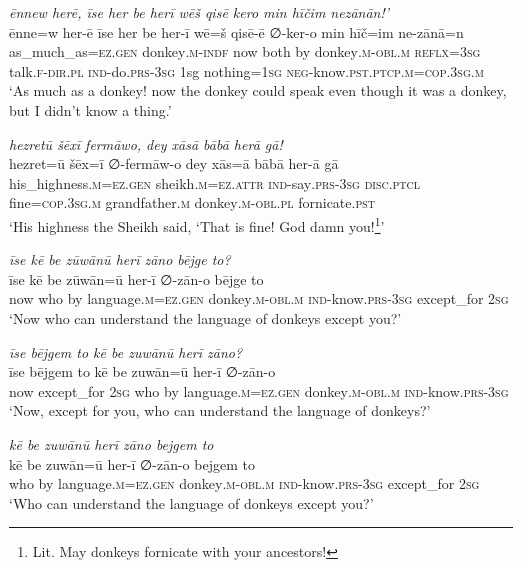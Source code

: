 \ea \label{HB.84}
\textit{ēnnew herē, īse her be herī wēš qisē kero min hīčim nezānān!’} \\ 
\gll ēnne=w her-ē īse her be her-ī wē=š qisē-ē ∅-ker-o min hīč=im ne-zānā=n \\ 
 as\_much\_as\textsc{=ez}\textsc{.gen} donkey\textsc{.m}\textsc{-indf} now both by donkey\textsc{.m}\textsc{-obl}\textsc{.m} \textsc{reflx}\textsc{=3sg} talk\textsc{\textsc{.f}}\textsc{-dir}\textsc{.pl} \textsc{ind-}do\textsc{.prs}\textsc{-3sg} 1sg nothing\textsc{=1sg} \textsc{neg-}know\textsc{.pst}\textsc{.ptcp}\textsc{.m}\textsc{=cop}\textsc{.3sg}\textsc{.m} \\ 
\glt `As much as a donkey! now the donkey could speak even though it was a donkey, but I didn’t know a thing.'
\z 
 
\ea \label{HB.85}
\textit{hezretū šēxī fermāwo, dey xāsā bābā herā gā!} \\ 
\gll hezret=ū šēx=ī ∅-fermāw-o dey xās=ā bābā her-ā gā \\ 
 his\_highness\textsc{.m}\textsc{=ez}\textsc{.gen} sheikh\textsc{.m}\textsc{=ez}.\textsc{attr} \textsc{ind-}say\textsc{.prs}\textsc{-3sg} \textsc{disc.ptcl} fine\textsc{=cop}\textsc{.3sg}\textsc{.m} grandfather\textsc{.m} donkey\textsc{.m}\textsc{-obl}\textsc{.pl} fornicate\textsc{.pst} \\ 
\glt `His highness the Sheikh said, ‘That is fine! God damn you!\footnote{Lit. May donkeys fornicate with your ancestors!}'
\z 
 
\ea \label{HB.86}
\textit{īse kē be zūwānū herī zāno bējge to?} \\ 
\gll īse kē be zūwān=ū her-ī ∅-zān-o bējge to \\ 
 now who by language\textsc{.m}\textsc{=ez}\textsc{.gen} donkey\textsc{.m}\textsc{-obl}\textsc{.m} \textsc{ind-}know\textsc{.prs}\textsc{-3sg} except\_for \textsc{2sg} \\ 
\glt `Now who can understand the language of donkeys except you?'
\z 
 
\ea \label{HB.87}
\textit{īse bējgem to kē be zuwānū herī zāno?} \\ 
\gll īse bējgem to kē be zuwān=ū her-ī ∅-zān-o \\ 
 now except\_for \textsc{2sg} who by language\textsc{.m}\textsc{=ez}\textsc{.gen} donkey\textsc{.m}\textsc{-obl}\textsc{.m} \textsc{ind-}know\textsc{.prs}\textsc{-3sg} \\ 
\glt `Now, except for you, who can understand the language of donkeys?'
\z 
 
\ea \label{HB.88}
\textit{kē be zuwānū herī zāno bejgem to} \\ 
\gll kē be zuwān=ū her-ī ∅-zān-o bejgem to \\ 
 who by language\textsc{.m}\textsc{=ez}\textsc{.gen} donkey\textsc{.m}\textsc{-obl}\textsc{.m} \textsc{ind-}know\textsc{.prs}\textsc{-3sg} except\_for \textsc{2sg} \\ 
\glt `Who can understand the language of donkeys except you?'
\z 
 
